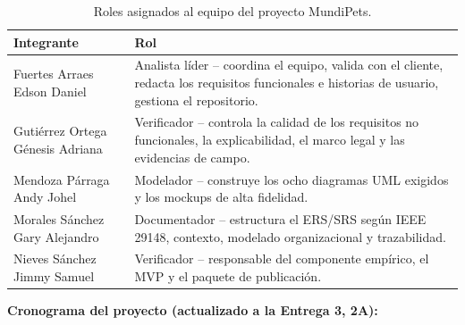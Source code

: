 \documentclass[journal,onecolumn]{IEEEtran}
\begin{document}
	\begin{table}[H]
		\caption{Roles asignados al equipo del proyecto MundiPets.}
		\centering
		\begin{tabularx}{\linewidth}{|X|X|}
			\hline
			\textbf{Integrante} & \textbf{Rol} \\
			\hline
			Fuertes Arraes Edson Daniel & Analista líder -- coordina el equipo, valida con el cliente, redacta los requisitos funcionales e historias de usuario, gestiona el repositorio. \\
			\hline
			Gutiérrez Ortega Génesis Adriana & Verificador -- controla la calidad de los requisitos no funcionales, la explicabilidad, el marco legal y las evidencias de campo. \\
			\hline
			Mendoza Párraga Andy Johel & Modelador -- construye los ocho diagramas UML exigidos y los mockups de alta fidelidad. \\
			\hline
			Morales Sánchez Gary Alejandro & Documentador -- estructura el ERS/SRS según IEEE 29148, contexto, modelado organizacional y trazabilidad. \\
			\hline
			Nieves Sánchez Jimmy Samuel & Verificador -- responsable del componente empírico, el MVP y el paquete de publicación. \\
			\hline
		\end{tabularx}
	\end{table}
	
	\textbf{Cronograma del proyecto (actualizado a la Entrega 3, 2A):}
	
\end{document}
